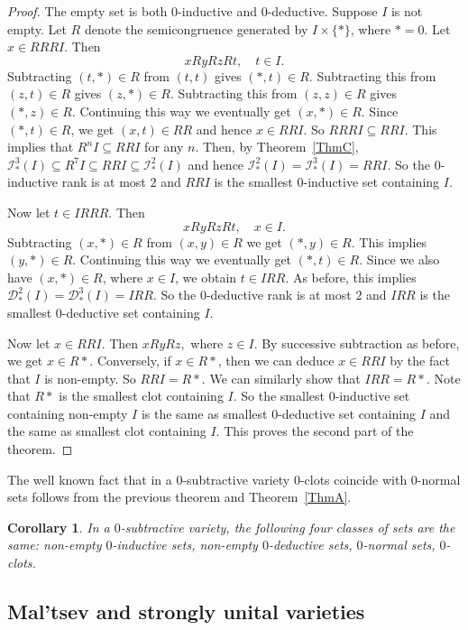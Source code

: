 \documentclass[12pt,english]{amsart}
\newtheorem{corollary}[theorem]{Corollary}
\theoremstyle{definition}
\numberwithin{equation}{section}
\theoremstyle{remark}
\newcommand{\indn}[2]{\mathcal{I}^{#2}_\top(#1)}
\newcommand{\dedn}[2]{\mathcal{D}^{#2}_\top(#1)}
\renewcommand{\top}{\ast}
\begin{document}
\begin{proof}
The empty set is both $0$-inductive and $0$-deductive. Suppose $I$ is not empty. Let $R$ denote the semicongruence generated by $I\times\{\top\}$, where $\ast=0$. Let $x\in RRRI$. Then 
$$xRyRzRt, \quad t\in I.$$ Subtracting $(t,\top)\in R$ from $(t,t)$ gives $(\top,t)\in R$. Subtracting this from $(z,t)\in R$ gives $(z,\top)\in R$. Subtracting this from $(z,z)\in R$ gives $(\top,z)\in R$. Continuing this way we eventually get $(x,\top)\in R$. Since $(\top,t)\in R$, we get $(x,t)\in RR$ and hence $x\in RRI$. So $RRRI\subseteq RRI$. This implies that $R^nI\subseteq RRI$ for any $n$. Then, by Theorem~\ref{ThmC}, $\indn{I}{3}\subseteq R^7I\subseteq RRI\subseteq \indn{I}{2}$ and hence $\indn{I}{2}=\indn{I}{3}=RRI$. So the $0$-inductive rank is at most $2$ and $RRI$ is the smallest $0$-inductive set containing $I$.

Now let $t\in IRRR$. Then $$xRyRzRt,\quad x\in I.$$
Subtracting $(x,\top)\in R$ from $(x,y)\in R$ we get $(\top,y)\in R$. This implies $(y,\top)\in R$. Continuing this way we eventually get $(\top,t)\in R$. Since we also have $(x,\top)\in R$, where $x\in I$, we obtain $t\in IRR$. As before, this implies $\dedn{I}{2}=\dedn{I}{3}=IRR$. So the $0$-deductive rank is at most $2$ and $IRR$ is the smallest $0$-deductive set containing $I$. 

Now let $x\in RRI$. Then $xRyRz,$ where $z\in I.$
By successive subtraction as before, we get $x\in R\top$. Conversely, if $x\in R\ast$, then we can deduce $x\in RRI$ by the fact that $I$ is non-empty. So $RRI=R\ast$. We can similarly show that $IRR=R\ast$. Note that $R\ast$ is the smallest clot containing $I$. So the smallest $0$-inductive set containing non-empty $I$ is the same as smallest $0$-deductive set containing $I$ and the same as smallest clot containing $I$. This proves the second part of the theorem.  
\end{proof}

The well known fact that in a $0$-subtractive variety $0$-clots coincide with $0$-normal sets follows from the previous theorem and Theorem~\ref{ThmA}.

\begin{corollary}\label{CorA}
In a $0$-subtractive variety, the following four classes of sets are the same: non-empty $0$-inductive sets, non-empty $0$-deductive sets, $0$-normal sets, $0$-clots.
\end{corollary}

\subsection{Mal'tsev and strongly unital varieties}\label{SubsecMalcev}
\end{document}
